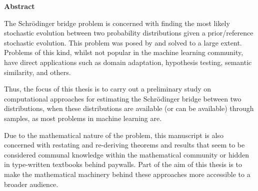 \newpage
{\Huge \bf Abstract}
\vspace{24pt} 

The Schrödinger bridge problem is concerned with finding the most likely stochastic evolution between two probability distributions given a prior/reference stochastic evolution. This problem was posed by \cite{schrodinger1931uber,schrodinger1932theorie} and solved to a large extent. Problems of this kind, whilst not popular in the machine learning community, have direct applications such as domain adaptation, hypothesis testing, semantic similarity, and others.

Thus, the focus of this thesis is to carry out a preliminary study on computational approaches for estimating the Schrödinger bridge between two distributions, when these distributions are available (or can be available) through samples, as most problems in machine learning are.

Due to the mathematical nature of the problem, this manuscript is also concerned with restating and re-deriving theorems and results that seem to be considered communal knowledge within the mathematical community or hidden in type-written textbooks behind paywalls. Part of the aim of this thesis is to make the mathematical machinery behind these approaches more accessible to a broader audience.
\newpage
\vspace*{\fill}
